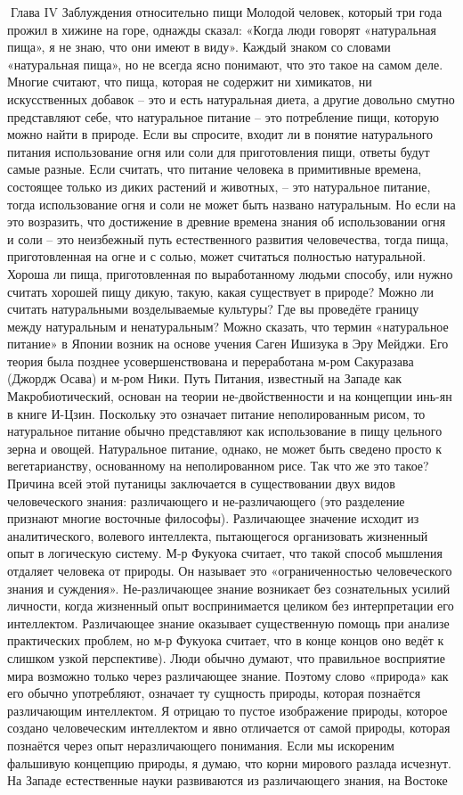 \documentclass[a4paper]{book}
\begin{document}
Глава IV Заблуждения относительно пищи
Молодой человек, который три года прожил в хижине на горе, однажды сказал: «Когда
люди говорят «натуральная пища», я не знаю, что они имеют в виду».
Каждый знаком со словами «натуральная пища», но не всегда ясно понимают, что это
такое на самом деле. Многие считают, что пища, которая не содержит ни химикатов, ни
искусственных добавок – это и есть натуральная диета, а другие довольно смутно
представляют себе, что натуральное питание – это потребление пищи, которую можно найти
в природе.
Если вы спросите, входит ли в понятие натурального питания использование огня или
соли для приготовления пищи, ответы будут самые разные. Если считать, что питание
человека в примитивные времена, состоящее только из диких растений и животных, – это
натуральное питание, тогда использование огня и соли не может быть названо натуральным.
Но если на это возразить, что достижение в древние времена знания об использовании огня
и соли – это неизбежный путь естественного развития человечества, тогда пища,
приготовленная на огне и с солью, может считаться полностью натуральной. Хороша ли
пища, приготовленная по выработанному людьми способу, или нужно считать хорошей пищу
дикую, такую, какая существует в природе? Можно ли считать натуральными возделываемые
культуры? Где вы проведёте границу между натуральным и ненатуральным?
Можно сказать, что термин «натуральное питание» в Японии возник на основе учения
Саген Ишизука в Эру Мейджи. Его теория была позднее усовершенствована и переработана
м-ром Сакуразава (Джордж Осава) и м-ром Ники. Путь Питания, известный на Западе как
Макробиотический, основан на теории не-двойственности и на концепции инь-ян в книге
И-Цзин. Поскольку это означает питание неполированным рисом, то натуральное питание
обычно представляют как использование в пищу цельного зерна и овощей. Натуральное
питание, однако, не может быть сведено просто к вегетарианству, основанному на
неполированном рисе.
Так что же это такое? Причина всей этой путаницы заключается в существовании двух
видов человеческого знания: различающего и не-различающего (это разделение признают
многие восточные философы). Различающее значение исходит из аналитического, волевого
интеллекта, пытающегося организовать жизненный опыт в логическую систему. М‑р
Фукуока считает, что такой способ мышления отдаляет человека от природы. Он называет
это «ограниченностью человеческого знания и суждения». Не-различающее знание
возникает без сознательных усилий личности, когда жизненный опыт воспринимается
целиком без интерпретации его интеллектом. Различающее знание оказывает существенную
помощь при анализе практических проблем, но м-р Фукуока считает, что в конце концов оно
ведёт к слишком узкой перспективе). Люди обычно думают, что правильное восприятие
мира возможно только через различающее знание. Поэтому слово «природа» как его обычно
употребляют, означает ту сущность природы, которая познаётся различающим интеллектом.
Я отрицаю то пустое изображение природы, которое создано человеческим
интеллектом и явно отличается от самой природы, которая познаётся через опыт неразличающего понимания. Если мы искореним фальшивую концепцию природы, я думаю,
что корни мирового разлада исчезнут.
На Западе естественные науки развиваются из различающего знания, на Востоке
\end{document}
